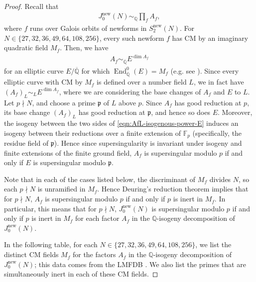 \documentclass[11pt,letterpaper,reqno]{amsart}
\theoremstyle{definition}
\numberwithin{equation}{section}
\numberwithin{figure}{section}
\numberwithin{table}{section}
\newcommand{\QQ}{\mathbb{Q}}
\newcommand{\nw}{\mathrm{new}}
\begin{document}
\begin{proof}
    Recall that 
    \begin{align}
        J_0^{\nw}(N) \sim_{\mathbb{Q}} \prod_{f} A_f,
    \end{align}
    where $f$ runs over Galois orbits of newforms in $S_2^{\nw}(N)$. 
    For $N \in \{27,32,36,49,64,108,256\}$, every such newform $f$ has CM by an imaginary quadratic field $M_f$. Then, we have
    \begin{align} \label{eqn:AfL-isogenous-power-E}
        A_f \sim_{\overline{\mathbb{Q}}} E^{\dim A_f}
    \end{align}
    for an elliptic curve $E/{\overline{\mathbb{Q}}}$ for which $\operatorname{End}^0_{\overline{\mathbb{Q}}}(E) =M_f$ (e.g. see \cite[proof of Theorem~4.7]{ribet1980twists}). Since every elliptic curve with CM by $M_f$ is defined over a number field $L$, we in fact have $(A_f)_L \sim_{L} E^{\dim A_f}$, where we are considering the base changes of $A_f$ and $E$ to $L$.
    Let $p \nmid N$, and choose a prime $\mathfrak p$ of $L$ above $p$. Since $A_f$ has good reduction at $p$, its base change $(A_f)_L$ has good reduction at $\mathfrak p$, and hence so does $E$. Moreover, the isogeny between the two sides of \eqref{eqn:AfL-isogenous-power-E} induces an isogeny between their reductions over a finite extension of $\mathbb{F}_p$ (specifically, the residue field of $\mathfrak p$). Hence since supersingularity is invariant under isogeny and finite extensions of the finite ground field, $A_f$ is supersingular modulo $p$ if and only if $E$ is supersingular modulo $\mathfrak p$. 
     
    
    Note that in each of the cases listed below, the discriminant of $M_f$ divides $N$, so each $p \nmid N$ is unramified in $M_f$. Hence Deuring's reduction theorem implies that for $p \nmid N$, 
    $A_f$ is supersingular modulo $p$ 
    if and only if     $p$ is inert in $M_f$. In particular, this means that for $p \nmid N$, $J_0^\nw(N)$ is supersingular modulo $p$ if and only if $p$ is inert in $M_f$ for each factor $A_f$ in the $\QQ$-isogeny decomposition of $J_0^\nw(N)$.
    
    In the following table, for each $N \in \{27,32,36,49,64,108,256\}$, we list the distinct CM fields $M_f$ for the factors $A_f$ in the $\QQ$-isogeny decomposition of $J_0^\nw(N)$; this data comes from the LMFDB \cite{lmfdb}.
    We also list the primes that are simultaneously inert in each of these CM fields.


\end{proof}
\end{document}
